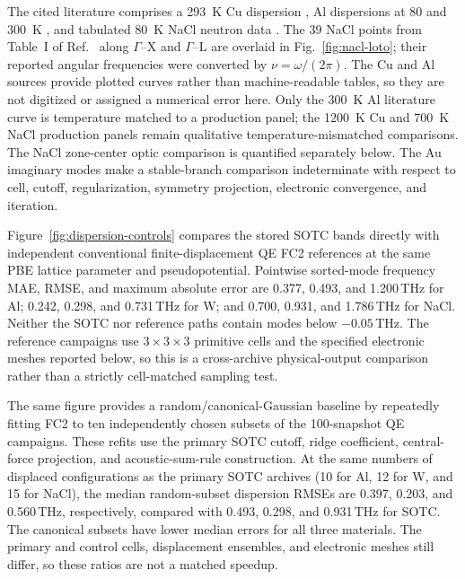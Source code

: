 \documentclass[aps,prb,reprint,amsmath,amssymb,floatfix]{revtex4-2}
\begin{document}
\color{revisionblue}
The cited literature comprises a 293~K Cu dispersion \cite{ref33}, Al
dispersions at 80 and 300~K \cite{ref34}, and tabulated 80~K NaCl neutron data
\cite{ref35}. The 39 NaCl points from Table~I of Ref.~\cite{ref35} along
\(\Gamma\)--X and \(\Gamma\)--L are overlaid in
Fig.~\ref{fig:nacl-loto}; their reported angular frequencies were converted by
\(\nu=\omega/(2\pi)\). The Cu and Al sources provide plotted curves rather than
machine-readable tables, so they are not digitized or assigned a numerical
error here. Only the 300~K Al literature curve is temperature matched to a
production panel; the 1200~K Cu and 700~K NaCl production panels remain
qualitative temperature-mismatched comparisons. The NaCl zone-center optic
comparison is quantified separately below.
The Au imaginary modes make a stable-branch comparison indeterminate with
respect to cell, cutoff, regularization, symmetry projection, electronic
convergence, and iteration.
\color{black}

\color{revisionblue}
Figure~\ref{fig:dispersion-controls} compares the stored SOTC bands directly
with independent conventional finite-displacement QE FC2 references at the same PBE lattice parameter and pseudopotential. Pointwise sorted-mode frequency MAE, RMSE, and maximum absolute error are 0.377, 0.493, and 1.200\,THz for Al; 0.242, 0.298, and 0.731\,THz for W; and 0.700, 0.931, and 1.786\,THz for NaCl. Neither the SOTC nor reference paths contain modes below \(-0.05\)\,THz. The reference campaigns use \(3\times3\times3\) primitive cells and the specified electronic meshes reported below, so this is a cross-archive physical-output comparison rather than a strictly cell-matched sampling test.
\color{black}

\color{revisionblue}
The same figure provides a random/canonical-Gaussian baseline by repeatedly
fitting FC2 to ten independently chosen subsets of the 100-snapshot QE
campaigns. These refits use the primary SOTC cutoff, ridge coefficient,
central-force projection, and acoustic-sum-rule construction. At the same
numbers of displaced configurations as the primary SOTC archives (10 for Al,
12 for W, and 15 for NaCl), the median random-subset dispersion RMSEs are
0.397, 0.203, and 0.560\,THz, respectively, compared with 0.493, 0.298, and
0.931\,THz for SOTC. The canonical subsets have lower median errors for all
three materials. The primary and control cells, displacement ensembles, and
electronic meshes still differ, so these ratios are not a matched speedup.
\color{black}
\end{document}
